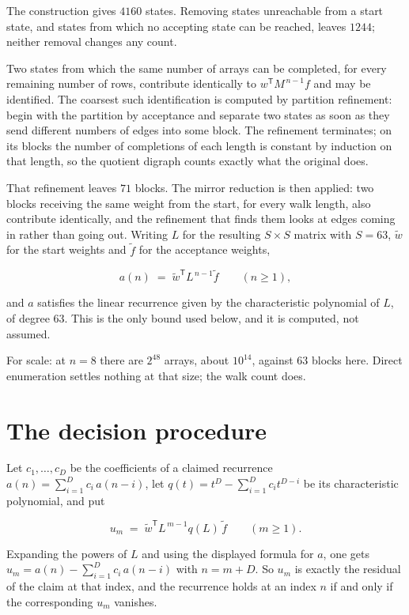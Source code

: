 \documentclass[11pt]{article}
\theoremstyle{definition}
\begin{document}
The construction gives $4160$ states. Removing states unreachable from a start state, and states from which no accepting state can be reached, leaves $1244$; neither removal changes any count.

Two states from which the same number of arrays can be completed, for every remaining number of rows, contribute identically to $w^{\mathsf T}M^{\,n-1}f$ and may be identified. The coarsest such identification is computed by partition refinement: begin with the partition by acceptance and separate two states as soon as they send different numbers of edges into some block. The refinement terminates; on its blocks the number of completions of each length is constant by induction on that length, so the quotient digraph counts exactly what the original does.

That refinement leaves $71$ blocks. The mirror reduction is then applied: two blocks receiving the same weight from the start, for every walk length, also contribute identically, and the refinement that finds them looks at edges coming in rather than going out. Writing $L$ for the resulting $S \times S$ matrix with $S = 63$, $\tilde w$ for the start weights and $\tilde f$ for the acceptance weights,

\[a(n) \;=\; \tilde w^{\mathsf T} L^{\,n-1} \tilde f \qquad (n \ge 1),\]

and $a$ satisfies the linear recurrence given by the characteristic polynomial of $L$, of degree $63$. This is the only bound used below, and it is computed, not assumed.

For scale: at $n = 8$ there are $2^{48}$ arrays, about $10^{14}$, against $63$ blocks here. Direct enumeration settles nothing at that size; the walk count does.

\section{The decision procedure}

Let $c_1,\dots,c_D$ be the coefficients of a claimed recurrence $a(n) = \sum_{i=1}^{D} c_i\,a(n-i)$, let $q(t) = t^{D} - \sum_{i=1}^{D} c_i t^{D-i}$ be its characteristic polynomial, and put

\[u_m \;=\; \tilde w^{\mathsf T} L^{\,m-1} q(L)\,\tilde f \qquad (m \ge 1).\]

Expanding the powers of $L$ and using the displayed formula for $a$, one gets $u_m = a(n) - \sum_{i=1}^{D} c_i\,a(n-i)$ with $n = m + D$. So $u_m$ is exactly the residual of the claim at that index, and the recurrence holds at an index $n$ if and only if the corresponding $u_m$ vanishes.
\end{document}
